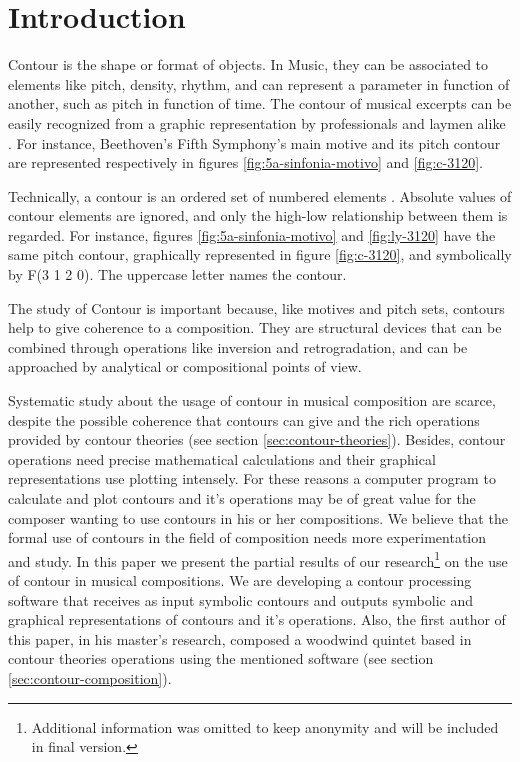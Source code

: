 

\section{Introduction}
\label{sec:introduction}
Contour is the shape or format of objects. In Music, they can be
associated to elements like pitch, density, rhythm, and can represent
a parameter in function of another, such as pitch in function of time.
The contour of musical excerpts can be easily recognized from a
graphic representation by professionals and laymen alike
\cite{marvin88:generalized}. For instance, Beethoven's Fifth
Symphony's main motive and its pitch contour are represented
respectively in figures \ref{fig:5a-sinfonia-motivo} and
\ref{fig:c-3120}.

Technically, a contour is an ordered set of numbered elements
\cite{morris93:directions}. Absolute values of contour elements are
ignored, and only the high-low relationship between them is
regarded. For instance, figures \ref{fig:5a-sinfonia-motivo} and
\ref{fig:ly-3120} have the same pitch contour, graphically represented
in figure \ref{fig:c-3120}, and symbolically by F(3 1 2 0). The
uppercase letter names the contour.

The study of Contour is important because, like motives and pitch
sets, contours help to give coherence to a composition. They are
structural devices that can be combined through operations like
inversion and retrogradation, and can be approached by analytical or
compositional points of view.

Systematic study about the usage of contour in musical composition are
scarce, despite the possible coherence that contours can give and the
rich operations provided by contour theories (see section
\ref{sec:contour-theories}). Besides, contour operations need precise
mathematical calculations and their graphical representations use
plotting intensely. For these reasons a computer program to calculate
and plot contours and it's operations may be of great value for the
composer wanting to use contours in his or her compositions. We
believe that the formal use of contours in the field of composition
needs more experimentation and study. In this paper we present the
partial results of our research\footnote{Additional information was
  omitted to keep anonymity and will be included in final version.} on
the use of contour in musical compositions. We are developing a
contour processing software that receives as input symbolic contours
and outputs symbolic and graphical representations of contours and
it's operations. Also, the first author of this paper, in his master's
research, composed a woodwind quintet based in contour theories
operations using the mentioned software (see section
\ref{sec:contour-composition}).

